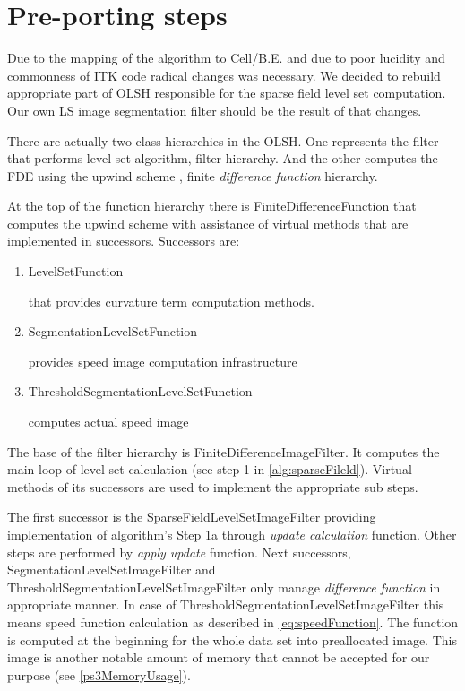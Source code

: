 \section{Pre-porting steps}
\par
Due to the mapping of the algorithm to \mbox{Cell/B.E.} and due to poor lucidity and commonness of ITK code radical changes was necessary.
We decided to rebuild appropriate part of OLSH responsible for the sparse field level set computation.
Our own LS image segmentation filter should be the result of that changes.

\par
There are actually two class hierarchies in the OLSH.
One represents the filter that performs level set algorithm, filter hierarchy.
And the other computes the FDE using the upwind scheme \cite{sethianLS}, finite \emph{difference function} hierarchy.

\par
At the top of the function hierarchy there is FiniteDifferenceFunction that computes the upwind scheme with assistance of virtual methods that are implemented in successors.
Successors are:
\begin{enumerate}
  \item{LevelSetFunction}
  \par
  that provides curvature term computation methods.

\item{SegmentationLevelSetFunction}
\par
provides speed image computation infrastructure

\item{ThresholdSegmentationLevelSetFunction}
\par
computes actual speed image
\end{enumerate}

\par
The base of the filter hierarchy is FiniteDifferenceImageFilter.
It computes the main loop of level set calculation (see step 1 in \ref{alg:sparseFileld}).
Virtual methods of its successors are used to implement the appropriate sub steps.

\par
The first successor is the SparseFieldLevelSetImageFilter providing implementation of algorithm's Step 1a through \emph{update calculation} function.
Other steps are performed by \emph{apply update} function.
Next successors, SegmentationLevelSetImageFilter and ThresholdSegmentationLevelSetImageFilter only manage \emph{difference function} in appropriate manner.
In case of ThresholdSegmentationLevelSetImageFilter this means speed function calculation as described in \ref{eq:speedFunction}.
The function is computed at the beginning for the whole data set into preallocated image.
This image is another notable amount of memory that cannot be accepted for our purpose (see \ref{ps3MemoryUsage}).

